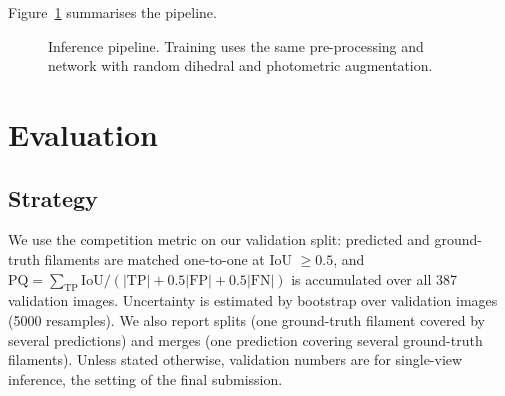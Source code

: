 \documentclass[sigconf]{acmart}
\begin{document}
    Figure~\ref{fig:pipeline} summarises the pipeline.

\begin{figure}[t]
\centering
{}
\caption{Inference pipeline. Training uses the same pre-processing and network with random dihedral and photometric augmentation.}
\label{fig:pipeline}
\end{figure}

\section{Evaluation}\label{sec:evaluation}

\subsection{Strategy}
    We use the competition metric on our validation split: predicted and ground-truth filaments are matched one-to-one at IoU $\ge0.5$, and $\mathrm{PQ}=\sum_{\mathrm{TP}}\mathrm{IoU}/(|\mathrm{TP}|+0.5|\mathrm{FP}|+0.5|\mathrm{FN}|)$ is accumulated over all 387 validation images. Uncertainty is estimated by bootstrap over validation images (5000 resamples). We also report splits (one ground-truth filament covered by several predictions) and merges (one prediction covering several ground-truth filaments). Unless stated otherwise, validation numbers are for single-view inference, the setting of the final submission.
\end{document}
